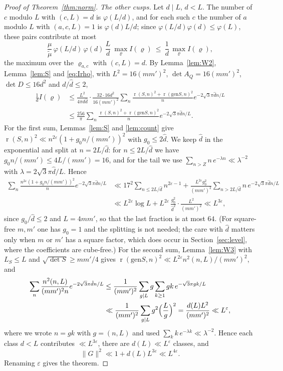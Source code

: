 \documentclass[11pt]{amsart}
\theoremstyle{remark}
\newcommand{\e}{\varepsilon}
\newcommand{\gen}{\mathrm{gen}}
\DeclareMathOperator{\rk}{r}
\begin{document}
\begin{proof}[Proof of Theorem~\ref{thm:norm}]
\emph{The other cusps.} Let $d\mid L$, $d<L$. The number of $c$ modulo $L$ with $(c,L)=d$ is $\varphi(L/d)$, and for each such $c$ the number of $a$ modulo $L$ with $(a,c,L)=1$ is $\varphi(d)L/d$; since $\varphi(L/d)\varphi(d)\le\varphi(L)$, these pairs contribute at most
\[
\frac{\mu}{\tilde\mu}\,\varphi(L/d)\,\varphi(d)\,\frac Ld\ \max_\varrho I(\varrho)\ \le\ \frac1d\,\max_\varrho I(\varrho),
\]
the maximum over the $\varrho_{a,c}$ with $(c,L)=d$. By Lemma~\ref{lem:W2}, Lemma~\ref{lem:S} and \eqref{eq:Irho}, with $L^2=16(mm')^2$, $\det A_Q=16(mm')^2$, $\det D\le16d^2$ and $d/\hat d\le2$,
\begin{align*}
\frac1dI(\varrho)&\le\frac{L^2}{4\pi d\hat d}\cdot\frac{32\cdot16d^2}{16(mm')^2}\sum_n\frac{\rk(S,n)^2+\rk(\gen S,n)^2}{n}e^{-2\sqrt3\pi\hat dn/L}\\
&\le\frac{256}{\pi}\sum_n\frac{\rk(S,n)^2+\rk(\gen S,n)^2}{n}e^{-2\sqrt3\pi\hat dn/L}.
\end{align*}
For the first sum, Lemmas~\ref{lem:S} and \ref{lem:count} give $\rk(S,n)^2\ll n^{2\e}(1+g_0n/(mm'))^2$ with $g_0\le2\hat d$. We keep $\hat d$ in the exponential and split at $n=2L/\hat d$: for $n\le2L/\hat d$ we have $g_0n/(mm')\le4L/(mm')=16$, and for the tail we use $\sum_{n>Z}n\,e^{-\lambda n}\ll\lambda^{-2}$ with $\lambda=2\sqrt3\pi\hat d/L$. Hence
\begin{align*}
\sum_n\frac{n^{2\e}(1+g_0n/(mm'))^2}{n}e^{-2\sqrt3\pi\hat dn/L}
&\ll 17^2\sum_{n\le 2L/\hat d}n^{2\e-1}+\frac{L^{2\e}g_0^2}{(mm')^2}\sum_{n>2L/\hat d}n\,e^{-2\sqrt3\pi\hat dn/L}\\
&\ll L^{2\e}\log L+L^{2\e}\,\frac{g_0^2}{\hat d^2}\cdot\frac{L^2}{(mm')^2}\ll L^{3\e},
\end{align*}
since $g_0/\hat d\le2$ and $L=4mm'$, so that the last fraction is at most $64$. (For square-free $m,m'$ one has $g_0=1$ and the splitting is not needed; the care with $\hat d$ matters only when $m$ or $m'$ has a square factor, which does occur in Section~\ref{sec:level}, where the coefficients are cube-free.)
For the second sum, Lemma~\ref{lem:W3} with $L_S\le L$ and $\sqrt{\det S}\ge mm'/4$ gives $\rk(\gen S,n)^2\ll L^{2\e}n^2(n,L)/(mm')^2$, and
\begin{align*}
\sum_n\frac{n^2(n,L)}{(mm')^2n}e^{-2\sqrt3\pi\hat dn/L}
&\le\frac1{(mm')^2}\sum_{g\mid L}g\sum_{k\ge1}gk\,e^{-\sqrt3\pi gk/L}\\
&\ll\frac1{(mm')^2}\sum_{g\mid L}g^2\Bigl(\frac{L}{g}\Bigr)^2=\frac{d(L)L^2}{(mm')^2}\ll L^{\e},
\end{align*}
where we wrote $n=gk$ with $g=(n,L)$ and used $\sum_kk\,e^{-\lambda k}\ll\lambda^{-2}$. Hence each class $d<L$ contributes $\ll L^{3\e}$, there are $d(L)\ll L^\e$ classes, and
\[
\|G\|^2\ll 1+d(L)L^{3\e}\ll L^{4\e}.
\]
Renaming $\e$ gives the theorem.
\end{proof}
\end{document}

